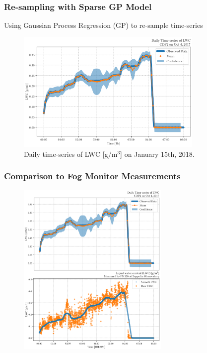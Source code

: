 \documentclass{beamer}
\begin{document}
\begin{frame}
    \frametitle{Re-sampling with Sparse GP Model}
    Using Gaussian Process Regression (GP) to re-sample time-series

    \begin{figure}
        \centering
        \includegraphics[width=0.8\textwidth]{img/cdp_gp02.png}
        \caption{Daily time-series of LWC [g/m$^3$] on January 15th, 2018.}
    \end{figure}
\end{frame}

\begin{frame}
    \frametitle{Comparison to Fog Monitor Measurements}
    \begin{figure}
        \centering
        \includegraphics[width=0.65\textwidth]{img/comp.png}
        \caption{}
    \end{figure}
\end{frame}
\end{document}
